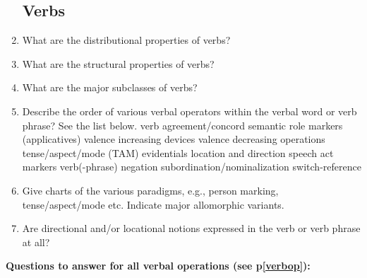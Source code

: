 \documentclass[twocolumn]{scrartcl}
\begin{document}
\begin{enumerate}[resume]
\subsection{Verbs}
\item What are the distributional properties of verbs? 
\item What are the structural properties of verbs?
\item What are the major subclasses of verbs?
\item Describe the order of various verbal operators within the verbal word or verb phrase? See the list below.\label{verbop}
\subitem verb agreement/concord
\subitem semantic role markers (applicatives)
\subitem valence increasing devices
\subitem valence decreasing operations
\subitem tense/aspect/mode (TAM)
\subitem evidentials
\subitem location and direction
\subitem speech act markers
\subitem verb(-phrase) negation
\subitem subordination/nominalization
\subitem switch-reference
\item Give charts of the various paradigms, e.g., person marking, tense/aspect/mode etc. Indicate major allomorphic variants.
\item Are directional and/or locational notions expressed in the verb or verb phrase at all?
\end{enumerate}
\textbf{Questions to answer for all verbal operations (see p\ref{verbop}):}
\end{document}

